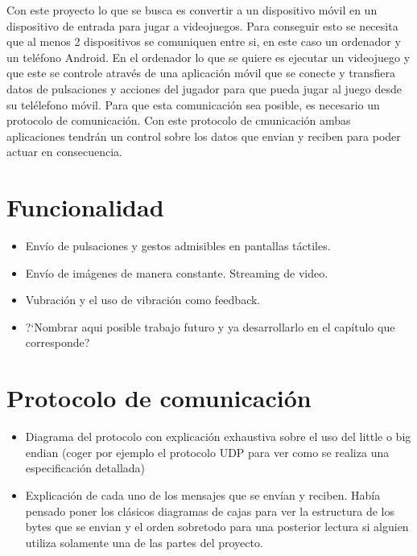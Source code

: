 Con este proyecto lo que se busca es convertir a un dispositivo m\'ovil en un dispositivo de entrada para jugar a videojuegos. Para conseguir esto se necesita que al menos 2 dispositivos se comuniquen entre si, en este caso un ordenador y un tel\'efono Android.
En el ordenador lo que se quiere es ejecutar un videojuego y que este se controle atrav\'es de una aplicaci\'on m\'ovil que se conecte y transfiera datos de pulsaciones y acciones del jugador para que pueda jugar al juego desde su tel\'elefono m\'ovil. Para que esta comunicaci\'on sea posible, es necesario un protocolo de comunicaci\'on. Con este protocolo de cmunicaci\'on ambas aplicaciones tendr\'an un control sobre los datos que envian y reciben para poder actuar en consecuencia.

\section{Funcionalidad}

\begin {itemize}
\item Env\'io de pulsaciones y gestos admisibles en pantallas t\'actiles.
\item Env\'io de im\'agenes de manera constante. Streaming de video.
\item Vubraci\'on y el uso de vibraci\'on como feedback.
\item ?`Nombrar aqui posible trabajo futuro y ya desarrollarlo en el cap\'itulo que corresponde?
\end {itemize}

\section{Protocolo de comunicaci\'on}
\begin {itemize}
\item Diagrama del protocolo con explicaci\'on exhaustiva sobre el uso del little o big endian (coger por ejemplo el protocolo UDP para ver como se realiza una especificaci\'on detallada)
\item Explicaci\'on de cada uno de los mensajes que se env\'ian y reciben. Hab\'ia pensado poner los cl\'asicos diagramas de cajas para ver la estructura de los bytes que se envian y el orden sobretodo para una posterior lectura si alguien utiliza solamente una de las partes del proyecto.
\end {itemize}



